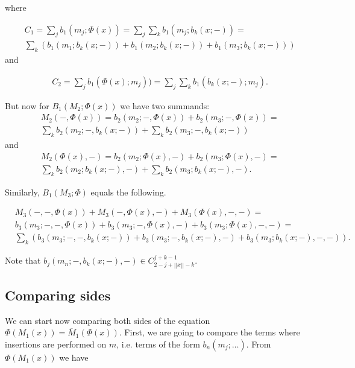 \documentclass[twoside]{article}
\begin{document}
where

\begin{align*}
&C_1=\sum_j b_1(m_j;\Phi(x))=\sum_j\sum_k b_1(m_j;b_k(x;-))=\\
&\sum_k(b_1(m_1;b_k(x;-))+b_1(m_2;b_k(x;-))+b_1(m_3;b_k(x;-)))
\end{align*}
and

\begin{align*}
&C_2=\sum_j b_1(\Phi(x);m_j))=\sum_j\sum_k b_1(b_k(x;-);m_j).
\end{align*}


But now for $B_1(M_2;\Phi(x))$ we have two summands:
\begin{align*}
&M_2(-,\Phi(x))=b_2(m_2;-,\Phi(x))+b_2(m_3;-,\Phi(x))=\\
&\sum_k b_2(m_2; -,b_k(x;-))+\sum_k b_2(m_3;-,b_k(x;-))
\end{align*}
and
\begin{align*}
&M_2(\Phi(x),-)=b_2(m_2;\Phi(x),-)+b_2(m_3;\Phi(x),-)=\\
&\sum_k b_2(m_2;b_k(x;-),-)+\sum_k b_2(m_3;b_k(x;-),-).
\end{align*}

Similarly, $B_1(M_3;\Phi)$ equals the following.

\begin{align*}
&M_3(-,-,\Phi(x))+M_3(-,\Phi(x),-)+M_3(\Phi(x),-,-)=\\
&b_3(m_3;-,-,\Phi(x))+b_3(m_3;-,\Phi(x),-)+b_3(m_3;\Phi(x),-,-)=\\
&\sum_k (b_3(m_3; -,-,b_k(x;-))+ b_3(m_3;-,b_k(x;-),-)+b_3(m_3;b_k(x;-),-,-)).
\end{align*}

Note that $b_j(m_n;-,b_k(x;-),-)\in C^{j+k-1}_{2-j+||x||-k}$.

\subsection{Comparing sides}

We can start now comparing both sides of the equation $\Phi(M_1(x))=\overline{M}_1(\Phi(x))$. First, we are going to compare the terms where insertions are performed on $m$, i.e. terms of the form $b_n(m_j;\dots)$. From $\Phi(M_1(x))$ we have
\end{document}
